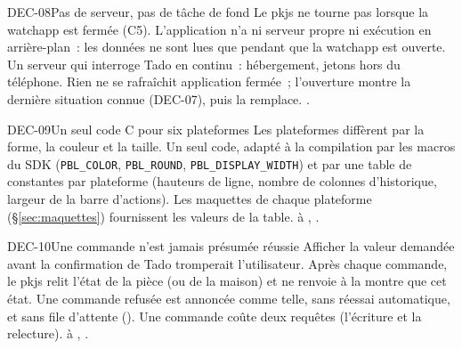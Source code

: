 \begin{decision}{DEC-08}{Pas de serveur, pas de tâche de fond}
   Le pkjs ne tourne pas lorsque la watchapp est fermée (C5).
   L'application n'a ni serveur propre ni exécution en arrière-plan~: les données ne sont lues
  que pendant que la watchapp est ouverte.
   Un serveur qui interroge Tado en continu~: hébergement, jetons hors du téléphone.
   Rien ne se rafraîchit application fermée~; l'ouverture montre la dernière situation connue
  (DEC-07), puis la remplace.
   .
\end{decision}

\begin{decision}{DEC-09}{Un seul code C pour six plateformes}
   Les plateformes diffèrent par la forme, la couleur et la taille.
   Un seul code, adapté à la compilation par les macros du SDK (\texttt{PBL\_COLOR},
  \texttt{PBL\_ROUND}, \texttt{PBL\_DISPLAY\_WIDTH}) et par une table de constantes par plateforme
  (hauteurs de ligne, nombre de colonnes d'historique, largeur de la barre d'actions).
   Les maquettes de chaque plateforme (§\ref{sec:maquettes}) fournissent les
  valeurs de la table.
    à , .
\end{decision}

\begin{decision}{DEC-10}{Une commande n'est jamais présumée réussie}
   Afficher la valeur demandée avant la confirmation de Tado tromperait l'utilisateur.
   Après chaque commande, le pkjs relit l'état de la pièce (ou de la maison) et
  ne renvoie à la montre que cet état. Une commande refusée est annoncée comme telle, sans
  réessai automatique, et sans file d'attente ().
   Une commande coûte deux requêtes (l'écriture et la relecture).
    à , .
\end{decision}

